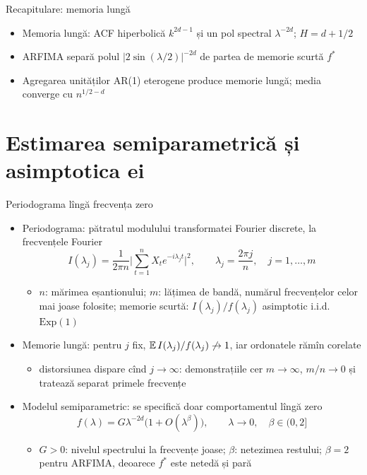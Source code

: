 \begin{frame}{Recapitulare: memoria lungă}
\itemsize{\small}
\begin{itemize}
    \item Memoria lungă: ACF hiperbolică $k^{2d-1}$ și un pol spectral $\lambda^{-2d}$; $H = d + 1/2$
    \item ARFIMA separă polul $|2\sin(\lambda/2)|^{-2d}$ de partea de memorie scurtă $f^*$
    \item Agregarea unităților AR(1) eterogene produce memorie lungă; media converge cu $n^{1/2-d}$
\end{itemize}
\end{frame}


\section{Estimarea semiparametrică și asimptotica ei}

\begin{frame}{Periodograma lîngă frecvența zero}
\itemsize{\small}
\begin{itemize}
    \item Periodograma: pătratul modulului transformatei Fourier discrete, la frecvențele Fourier
    \[ I(\lambda_j) = \frac{1}{2\pi n}\Big|\sum_{t=1}^n X_te^{-i\lambda_jt}\Big|^2, \qquad \lambda_j = \frac{2\pi j}{n}, \quad j = 1, \dots, m \]
    \begin{itemize}
        \item $n$: mărimea eșantionului; $m$: lățimea de bandă, numărul frecvențelor celor mai joase folosite; memorie scurtă: $I(\lambda_j)/f(\lambda_j)$ asimptotic i.i.d.\ $\mathrm{Exp}(1)$
    \end{itemize}
    \item Memorie lungă: pentru $j$ fix, $\mathbb{E}\,I(\lambda_j)/f(\lambda_j) \not\to 1$, iar ordonatele rămîn corelate 
    \begin{itemize}
        \item distorsiunea dispare cînd $j \to \infty$: demonstrațiile cer $m \to \infty$, $m/n \to 0$ și tratează separat primele frecvențe
    \end{itemize}
    \item Modelul semiparametric: se specifică doar comportamentul lîngă zero
    \[ f(\lambda) = G\lambda^{-2d}\big(1 + O(\lambda^\beta)\big), \qquad \lambda \to 0, \quad \beta \in (0, 2] \]
    \begin{itemize}
        \item $G > 0$: nivelul spectrului la frecvențe joase; $\beta$: netezimea restului; $\beta = 2$ pentru ARFIMA, deoarece $f^*$ este netedă și pară
    \end{itemize}
\end{itemize}
\end{frame}

